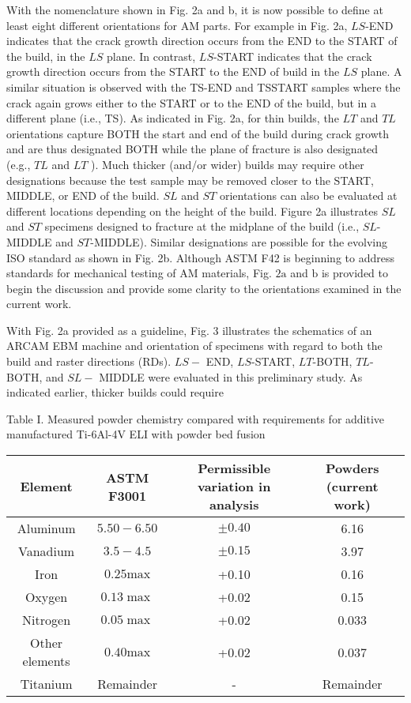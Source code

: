 \documentclass[10pt]{article}
\begin{document}
With the nomenclature shown in Fig. 2a and b, it is now possible to define at least eight different orientations for AM parts. For example in Fig. 2a, $L S$-END indicates that the crack growth direction occurs from the END to the START of the build, in the $L S$ plane. In contrast, $L S$-START indicates that the crack growth direction occurs from the START to the END of build in the $L S$ plane. A similar situation is observed with the TS-END and TSSTART samples where the crack again grows either to the START or to the END of the build, but in a different plane (i.e., TS). As indicated in Fig. 2a, for thin builds, the $L T$ and $T L$ orientations capture BOTH the start and end of the build during crack growth and are thus designated BOTH while the plane of fracture is also designated (e.g., $T L$ and $L T$ ). Much thicker (and/or wider) builds may require other designations because the test sample may be removed closer to the START, MIDDLE, or END of the build. $S L$ and $S T$ orientations can also be evaluated at different locations depending on the height of the build. Figure 2a illustrates $S L$ and $S T$ specimens designed to fracture at the midplane of the build (i.e., $S L$-MIDDLE and $S T$-MIDDLE). Similar designations are possible for the evolving ISO standard as shown in Fig. 2b. Although ASTM F42 is beginning to address standards for mechanical testing of AM materials, Fig. $2 \mathrm{a}$ and $\mathrm{b}$ is provided to begin the discussion and provide some clarity to the orientations examined in the current work.

With Fig. 2a provided as a guideline, Fig. 3 illustrates the schematics of an ARCAM EBM machine and orientation of specimens with regard to both the build and raster directions (RDs). $L S-$ END, $L S$-START, $L T$-BOTH, $T L$-BOTH, and $S L-$ MIDDLE were evaluated in this preliminary study. As indicated earlier, thicker builds could require

Table I. Measured powder chemistry compared with requirements for additive manufactured Ti-6Al-4V ELI with powder bed fusion

\begin{center}
\begin{tabular}{|c|c|c|c|}
\hline
Element & ASTM F3001 & Permissible variation in analysis & Powders (current work) \\
\hline
Aluminum & $5.50-6.50$ & $\pm 0.40$ & 6.16 \\
\hline
Vanadium & $3.5-4.5$ & $\pm 0.15$ & 3.97 \\
\hline
Iron & $0.25 \mathrm{max}$ & +0.10 & 0.16 \\
\hline
Oxygen & $0.13 \max$ & +0.02 & 0.15 \\
\hline
Nitrogen & $0.05 \max$ & +0.02 & 0.033 \\
\hline
Other elements & $0.40 \mathrm{max}$ & +0.02 & 0.037 \\
\hline
Titanium & Remainder & - & Remainder \\
\hline
\end{tabular}
\end{center}
\end{document}
